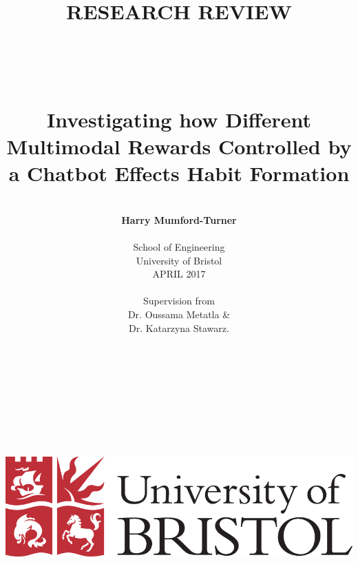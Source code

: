 \date{} %


\title{\large{RESEARCH REVIEW}
\\
\huge{\textbf{\\\\\\Investigating how Different Multimodal Rewards Controlled by a Chatbot Effects Habit Formation}}}
\author{\\
\textbf{Harry Mumford-Turner}\\
\\
School of Engineering\\
University of Bristol\\
APRIL 2017\\
\\
Supervision from\\
Dr. Oussama Metatla \&\\Dr. Katarzyna Stawarz.
\\
\\\\
\\
\\
\\
\\
\\
\\
\\
\includegraphics[scale=0.29]{resources/UoB-logo.png}}
